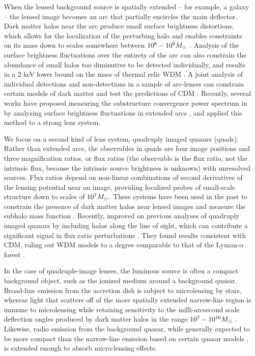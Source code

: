When the lensed background source is spatially extended -- for example, a galaxy -- the lensed image becomes an arc that partially encircles the main deflector. Dark matter halos near the arc produce small surface brightness distortions, which allows for the localization of the perturbing halo and enables constraints on its mass down to scales somewhere between $10^8 - 10^9 {M_{\odot}}$ \citep{Veg++14,Hezaveh++16}. Analysis of the surface brightness fluctuations over the entirety of the arc can also constrain the abundance of small halos too diminutive to be detected individually, and results in a 2 keV lower bound on the mass of thermal relic WDM \citep{Birrer++17a}. A joint analysis of individual detections and non-detections in a sample of arc-lenses can constrain certain models of dark matter and test the predictions of CDM \citep{Vegetti++18,Ritondale++18}. Recently, several works have proposed measuring the substructure convergence power spectrum in by analyzing surface brightness fluctuations in extended arcs \citep{Hezaveh++16b,Cyr-Racine++18,DiazRivero++18,Brennan++18}, and \citet{Bayer++18} applied this method to a strong lens system. 

We focus on a second kind of lens system, quadruply imaged quasars (quads). Rather than extended arcs, the observables in quads are four image positions and three magnification ratios, or flux ratios (the observable is the flux ratio, not the intrinsic flux, because the intrinsic source brightness is unknown) with unresolved sources. Flux ratios depend on non-linear combinations of second derivatives of the lensing potential near an image, providing localized probes of small-scale structure down to scales of $10^{7} {M_{\odot}}$. These systems have been used in the past to constrain the presence of dark matter halos near lensed images \citep{MetcalfMadau01,Metcalf++02,Amara++06,Nierenberg++14,Nierenberg++17} and measure the subhalo mass function \citep{D+K02}. Recently, \citet{Hsueh++19} improved on previous analyses of quadruply imaged quasars by including halos along the line of sight, which can contribute a significant signal in flux ratio perturbations \citep{Xu++12,Gilman++18}. They found results consistent with CDM, ruling out WDM models to a degree comparable to that of the Lyman-$\alpha$ forest \citep{Viel13,Irsic++17}. 

In the case of quadruple-image lenses, the luminous source is often a compact background object, such as the ionized medium around a background quasar. Broad-line emission from the accretion disk is subject to microlensing by stars, whereas light that scatters off of the more spatially extended narrow-line region is immune to microlensing while retaining sensitivity to the milli-arcsecond scale deflection angles produced by dark matter halos in the range $10^7 -10^{10}{M_{\odot}}$ \citep{MoustakasMetcalf02,Sugai++07,Nierenberg++14, Nierenberg++17}. Likewise, radio emission from the background quasar, while generally expected to be more compact than the narrow-line emission based on certain quasar models \citep{ElitzurSholsman06,Combes++19}, is extended enough to absorb micro-lensing effects. 


